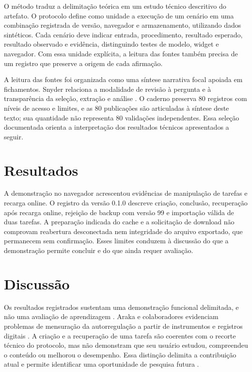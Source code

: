 O método traduz a delimitação teórica em um estudo técnico descritivo do artefato. O protocolo define como unidade a execução de um cenário em uma combinação registrada de versão, navegador e armazenamento, utilizando dados sintéticos. Cada cenário deve indicar entrada, procedimento, resultado esperado, resultado observado e evidência, distinguindo testes de modelo, widget e navegador. Com essa unidade explícita, a leitura das fontes também precisa de um registro que preserve a origem de cada afirmação.

A leitura das fontes foi organizada como uma síntese narrativa focal apoiada em fichamentos. Snyder relaciona a modalidade de revisão à pergunta e à transparência da seleção, extração e análise \citep[p. 336–337]{SU11}. O caderno preserva 80 registros com níveis de acesso e limites, e as 80 publicações são articuladas à síntese deste texto; sua quantidade não representa 80 validações independentes. Essa seleção documentada orienta a interpretação dos resultados técnicos apresentados a seguir.

\clearpage\section{Resultados}



A demonstração no navegador acrescentou evidências de manipulação de tarefas e recarga online. O registro da versão 0.1.0 descreve criação, conclusão, recuperação após recarga online, rejeição de backup com versão 99 e importação válida de duas tarefas. A preparação indicada do cache e a solicitação de download não comprovam reabertura desconectada nem integridade do arquivo exportado, que permanecem sem confirmação. Esses limites conduzem à discussão do que a demonstração permite concluir e do que ainda requer avaliação.

\clearpage\section{Discussão}

Os resultados registrados sustentam uma demonstração funcional delimitada, e não uma avaliação de aprendizagem \citep[p. 4, 15–16]{education_araka2020}. Araka e colaboradores evidenciam problemas de mensuração da autorregulação a partir de instrumentos e registros digitais \citep[p. 4, 15–16]{education_araka2020}. A criação e a recuperação de uma tarefa são coerentes com o recorte técnico do protocolo, mas não demonstram que seu usuário estudou, compreendeu o conteúdo ou melhorou o desempenho. Essa distinção delimita a contribuição atual e permite identificar uma oportunidade de pesquisa futura \citep[p. 4, 15–16]{education_araka2020}.

